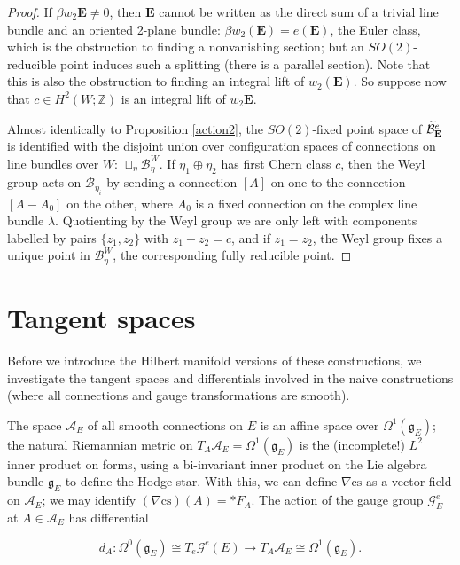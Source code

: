 \documentclass[10pt,a4paper]{amsart}
\theoremstyle{definition}
\theoremstyle{remark}
\numberwithin{figure}{qchap}
\begin{document}
\begin{proof}If $\beta w_2 \mathbf{E} \neq 0$, then $\mathbf{E}$ cannot be written as the direct sum of a trivial line bundle and an oriented 2-plane bundle: $\beta w_2(\mathbf{E}) = e(\mathbf{E})$, the Euler class, which is the obstruction to finding a nonvanishing section; but an $SO(2)$-reducible point induces such a splitting (there is a parallel section). Note that this is also the obstruction to finding an integral lift of $w_2(\mathbf{E})$. So suppose now that $c \in H^2(W;\mathbb Z)$ is an integral lift of $w_2 \mathbf{E}$.

Almost identically to Proposition \ref{action2}, the $SO(2)$-fixed point space of $\widetilde{\mathcal B}^{e}_{\bf E}$ is identified with the disjoint union over configuration spaces of connections on line bundles over $W$: $\sqcup_{\eta} \mathcal B^{W}_{\eta}$. If $\eta_1 \oplus \eta_2$ has first Chern class $c$, then the Weyl group acts on $\mathcal B_{\eta_i}$ by sending a connection $[A]$ on one to the connection $[A - A_0]$ on the other, where $A_0$ is a fixed connection on the complex line bundle $\lambda$. Quotienting by the Weyl group we are only left with components labelled by pairs $\{z_1, z_2\}$ with $z_1 + z_2 = c$, and if $z_1 = z_2$, the Weyl group fixes a unique point in $\mathcal B^W_\eta$, the corresponding fully reducible point.
\end{proof}

\section{Tangent spaces}\label{sec:config-tangent}
Before we introduce the Hilbert manifold versions of these constructions, we investigate the tangent spaces and differentials involved in the naive constructions (where all connections and gauge transformations are smooth). 

The space $\mathcal A_E$ of all smooth connections on $E$ is an affine space over $\Omega^1(\mathfrak g_E)$; the natural Riemannian metric on $T_A \mathcal A_E = \Omega^1(\mathfrak g_E)$ is the (incomplete!) $L^2$ inner product on forms, using a bi-invariant inner product on the Lie algebra bundle $\mathfrak g_E$ to define the Hodge star. With this, we can define $\nabla \text{cs}$ as a vector field on $\mathcal A_E$; we may identify $(\nabla \text{cs})(A) = *F_A$. The action of the gauge group $\mathcal G^e_E$ at $A \in \mathcal A_E$ has differential 

$$d_A: \Omega^0(\mathfrak g_E) \cong T_e \mathcal G^e(E) \to T_A \mathcal A_E \cong \Omega^1(\mathfrak g_E).$$
\end{document}
